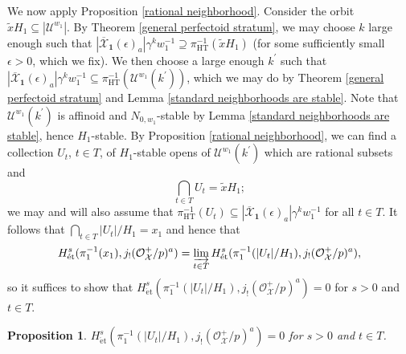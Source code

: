 \documentclass{amsart}
\newtheorem{prop}[subsubsection]{Proposition}
\theoremstyle{remark}
\numberwithin{equation}{subsection}
\newcommand{\cO}{{\mathcal O}}
\newcommand{\cU}{{\mathcal U}}
\newcommand{\cX}{{\mathcal X}}
\newcommand{\HT}{\mathrm{HT}}
\newcommand{\et}{\mathrm{\acute{e}t}}
\newcommand{\mbf}{\mathbf}
\newcommand{\ocX}{\overline{\mathcal{X}}}
\newcommand{\wt}{\widetilde}
\newcommand{\sub}{\subseteq}
\renewcommand{\(}{\left(}
\renewcommand{\)}{\right)}
\begin{document}
\medskip

We now apply Proposition \ref{rational neighborhood}. Consider the orbit $\wt{x}H_1 \sub |\cU^{w_1}|$. By Theorem \ref{general perfectoid stratum}, we may choose $k$ large enough such that $|\ocX_{\mbf{1}}(\epsilon)_{a}|\gamma^{k}w_1^{-1} \supseteq \pi^{-1}_\HT(\wt{x}H_1)$ (for some sufficiently small $\epsilon >0$, which we fix). We then choose a large enough $k^{\prime}$ such that $|\ocX_{\mbf{1}}(\epsilon)_{a}|\gamma^{k}w_1^{-1} \sub \pi^{-1}_{\HT}(\cU^{w_1}(k^{\prime}))$, which we may do by Theorem \ref{general perfectoid stratum} and Lemma \ref{standard neighborhoods are stable}. Note that $\cU^{w_1}(k^{\prime})$ is affinoid and $N_{0,w_1}$-stable by Lemma \ref{standard neighborhoods are stable}, hence $H_1$-stable. By Proposition \ref{rational neighborhood}, we can find a collection $U_{t}$, $t\in T$,
of $H_1$-stable opens of $\cU^{w_1}(k^{\prime})$ which are rational subsets and
\[
 \bigcap_{t\in T}U_{t} = \wt{x}H_1;
 \]
we may and will also assume that $\pi_{\HT}^{-1}(U_{t}) \sub |\ocX_{\mbf{1}}(\epsilon)_{a}|\gamma^{k}w_1^{-1}$ for all $t\in T$. It follows that $\bigcap_{t\in T}|U_{t}|/H_1 = x_1$ and hence that
\[
 H^{s}_{\et}(\pi_1^{-1}(x_1), j_{!}(\cO_{\cX}^{+}/p)^{a}) = \varinjlim_{t\in T} H^{s}_{\et}(\pi_1^{-1}(|U_{t}|/H_1), j_{!}(\cO_{\cX}^{+}/p)^{a}), 
 \]
so it suffices to show that $H^{s}_{\et}(\pi_1^{-1}(|U_{t}|/H_1), j_{!}(\cO_{\cX}^{+}/p)^{a})=0$ for $s>0$ and $t\in T$.

\begin{prop}\label{cohomology vanishing for rational neighborhoods}
$H^{s}_{\et}(\pi_1^{-1}(|U_{t}|/H_1), j_{!}(\cO_{\cX}^{+}/p)^{a})=0$ for $s>0$ and $t\in T$.
\end{prop}
\end{document}
